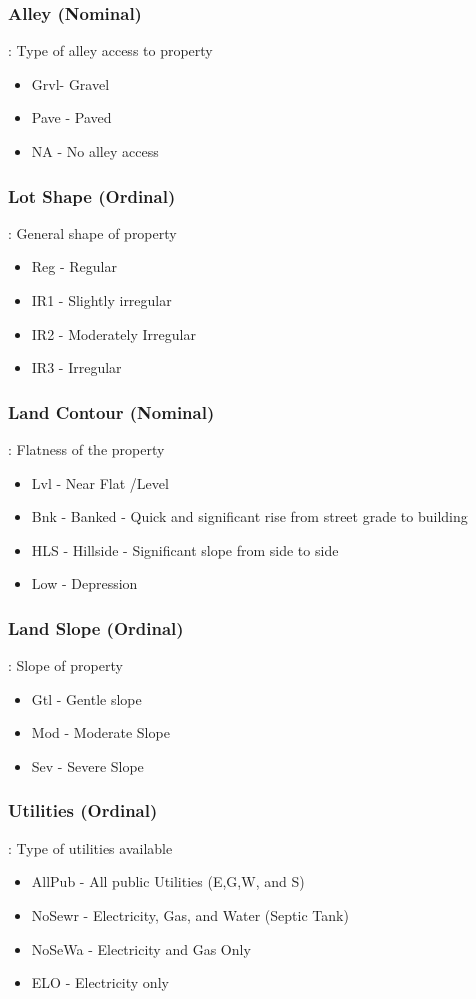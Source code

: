 \documentclass[sigconf]{acmart}
\begin{document}
	\subsubsection{Alley (Nominal)}: Type of alley access to property
	\begin{itemize}
		\item  Grvl- Gravel
		\item  Pave - Paved
		\item  NA - No alley access
	\end{itemize}
	
	\subsubsection{Lot Shape (Ordinal)}: General shape of property
	\begin{itemize}
		\item  Reg - Regular
		\item  IR1 - Slightly irregular
		\item  IR2 - Moderately Irregular
		\item  IR3 - Irregular
	\end{itemize}
	
	\subsubsection{Land Contour (Nominal)}: Flatness of the property
	\begin{itemize}
		\item  Lvl - Near Flat /Level
		\item  Bnk - Banked - Quick and significant rise from street grade to building
		\item  HLS - Hillside - Significant slope from side to side
		\item  Low - Depression
	\end{itemize}
	\subsubsection{Land Slope (Ordinal)}: Slope of property
	\begin{itemize}
		\item  Gtl - Gentle slope
		\item  Mod - Moderate Slope
		\item  Sev - Severe Slope
	\end{itemize}
	
	\subsubsection{Utilities (Ordinal)}: Type of utilities available
	\begin{itemize}
		\item  AllPub  - All public Utilities (E,G,W, and S)
		\item  NoSewr  - Electricity, Gas, and Water (Septic Tank)
		\item  NoSeWa  - Electricity and Gas Only
		\item  ELO - Electricity only
	\end{itemize}
	
\end{document}
